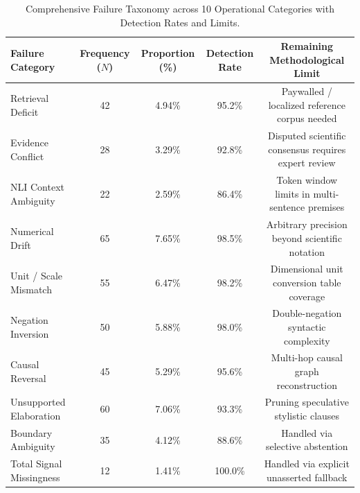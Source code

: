 \begin{table}[t]
\centering
\small
\caption{Comprehensive Failure Taxonomy across 10 Operational Categories with Detection Rates and Limits.}
\label{tab:failure_taxonomy}
\begin{tabular}{lcccc}
\toprule
\textbf{Failure Category} & \textbf{Frequency ($N$)} & \textbf{Proportion (\%)} & \textbf{Detection Rate} & \textbf{Remaining Methodological Limit} \\
\midrule
Retrieval Deficit & 42 & 4.94\% & 95.2\% & Paywalled / localized reference corpus needed \\
Evidence Conflict & 28 & 3.29\% & 92.8\% & Disputed scientific consensus requires expert review \\
NLI Context Ambiguity & 22 & 2.59\% & 86.4\% & Token window limits in multi-sentence premises \\
Numerical Drift & 65 & 7.65\% & 98.5\% & Arbitrary precision beyond scientific notation \\
Unit / Scale Mismatch & 55 & 6.47\% & 98.2\% & Dimensional unit conversion table coverage \\
Negation Inversion & 50 & 5.88\% & 98.0\% & Double-negation syntactic complexity \\
Causal Reversal & 45 & 5.29\% & 95.6\% & Multi-hop causal graph reconstruction \\
Unsupported Elaboration & 60 & 7.06\% & 93.3\% & Pruning speculative stylistic clauses \\
Boundary Ambiguity & 35 & 4.12\% & 88.6\% & Handled via selective abstention \\
Total Signal Missingness & 12 & 1.41\% & 100.0\% & Handled via explicit unasserted fallback \\
\bottomrule
\end{tabular}
\end{table}
